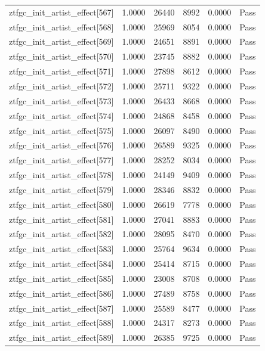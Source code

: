 \begin{table}[htbp]
\begin{tabular}{llrrll}
ztfgc\_init\_artist\_effect[567] & 1.0000 & 26440 & 8992 & 0.0000 & Pass \\
ztfgc\_init\_artist\_effect[568] & 1.0000 & 25969 & 8054 & 0.0000 & Pass \\
ztfgc\_init\_artist\_effect[569] & 1.0000 & 24651 & 8891 & 0.0000 & Pass \\
ztfgc\_init\_artist\_effect[570] & 1.0000 & 23745 & 8882 & 0.0000 & Pass \\
ztfgc\_init\_artist\_effect[571] & 1.0000 & 27898 & 8612 & 0.0000 & Pass \\
ztfgc\_init\_artist\_effect[572] & 1.0000 & 25711 & 9322 & 0.0000 & Pass \\
ztfgc\_init\_artist\_effect[573] & 1.0000 & 26433 & 8668 & 0.0000 & Pass \\
ztfgc\_init\_artist\_effect[574] & 1.0000 & 24868 & 8458 & 0.0000 & Pass \\
ztfgc\_init\_artist\_effect[575] & 1.0000 & 26097 & 8490 & 0.0000 & Pass \\
ztfgc\_init\_artist\_effect[576] & 1.0000 & 26589 & 9325 & 0.0000 & Pass \\
ztfgc\_init\_artist\_effect[577] & 1.0000 & 28252 & 8034 & 0.0000 & Pass \\
ztfgc\_init\_artist\_effect[578] & 1.0000 & 24149 & 9409 & 0.0000 & Pass \\
ztfgc\_init\_artist\_effect[579] & 1.0000 & 28346 & 8832 & 0.0000 & Pass \\
ztfgc\_init\_artist\_effect[580] & 1.0000 & 26619 & 7778 & 0.0000 & Pass \\
ztfgc\_init\_artist\_effect[581] & 1.0000 & 27041 & 8883 & 0.0000 & Pass \\
ztfgc\_init\_artist\_effect[582] & 1.0000 & 28095 & 8470 & 0.0000 & Pass \\
ztfgc\_init\_artist\_effect[583] & 1.0000 & 25764 & 9634 & 0.0000 & Pass \\
ztfgc\_init\_artist\_effect[584] & 1.0000 & 25414 & 8715 & 0.0000 & Pass \\
ztfgc\_init\_artist\_effect[585] & 1.0000 & 23008 & 8708 & 0.0000 & Pass \\
ztfgc\_init\_artist\_effect[586] & 1.0000 & 27489 & 8758 & 0.0000 & Pass \\
ztfgc\_init\_artist\_effect[587] & 1.0000 & 25589 & 8477 & 0.0000 & Pass \\
ztfgc\_init\_artist\_effect[588] & 1.0000 & 24317 & 8273 & 0.0000 & Pass \\
ztfgc\_init\_artist\_effect[589] & 1.0000 & 26385 & 9725 & 0.0000 & Pass \\

\end{tabular}
\end{table}
